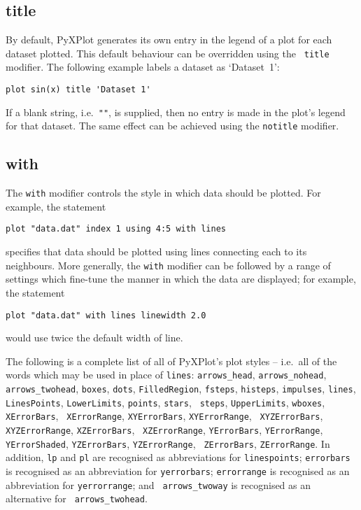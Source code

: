 \subsection{title}

By default, PyXPlot generates its own entry in the legend of a plot for each
dataset plotted.  This default behaviour can be overridden using the {\tt
title} modifier. The following example labels a dataset as `Dataset~1':

\begin{verbatim}
plot sin(x) title 'Dataset 1'
\end{verbatim}

\noindent If a blank string, i.e.\ {\tt ""}, is supplied, then no entry is made
in the plot's legend for that dataset. The same effect can be achieved using
the {\tt notitle} modifier.


\subsection{with}

The {\tt with} modifier controls the style in which data should be plotted. For
example, the statement
\begin{verbatim}
plot "data.dat" index 1 using 4:5 with lines
\end{verbatim}
specifies that data should be plotted using lines connecting each \datapoint to
its neighbours. More generally, the {\tt with} modifier can be followed by a
range of settings which fine-tune the manner in which the data are displayed;
for example, the statement
\begin{verbatim}
plot "data.dat" with lines linewidth 2.0
\end{verbatim}
would use twice the default width of line.

The following is a complete list of all of PyXPlot's plot styles -- i.e.\ all
of the words which may be used in place of {\tt lines}: {\tt arrows\_\-head},
{\tt arrows\_\-no\-head}, {\tt arrows\_\-two\-head}, {\tt boxes}, {\tt dots},
{\tt Filled\-Region}, {\tt fsteps}, {\tt histeps}, {\tt impulses}, {\tt lines},
{\tt Lines\-Points}, {\tt Lower\-Limits}, {\tt points}, {\tt stars}, {\tt
steps}, {\tt Upper\-Limits}, {\tt wbox\-es}, {\tt X\-Error\-Bars}, {\tt
X\-Error\-Range}, {\tt XY\-Error\-Bars}, {\tt XY\-Error\-Range}, {\tt
XYZ\-Error\-Bars}, {\tt XYZ\-Error\-Range}, {\tt XZ\-Error\-Bars}, {\tt
XZ\-Error\-Range}, {\tt Y\-Error\-Bars}, {\tt Y\-Error\-Range}, {\tt
Y\-Error\-Shaded}, {\tt YZ\-Error\-Bars}, {\tt YZ\-Error\-Range}, {\tt
Z\-Error\-Bars}, {\tt Z\-Error\-Range}. In addition, {\tt lp} and {\tt pl} are
recognised as abbreviations for {\tt lines\-points}; {\tt error\-bars} is
recognised as an abbreviation for {\tt y\-error\-bars}; {\tt error\-range} is
recognised as an abbreviation for {\tt y\-error\-range}; and {\tt
arrows\_\-two\-way} is recognised as an alternative for {\tt
arrows\_\-two\-head}.

